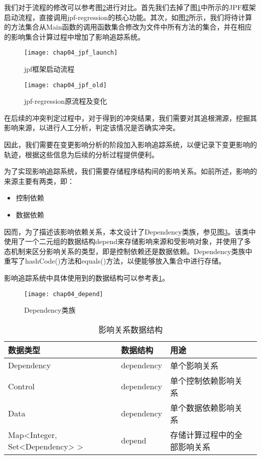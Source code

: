 我们对于流程的修改可以参考图\ref {impact_process_old}进行对比。首先我们去掉了图\ref {impact_process}中所示的JPF框架启动流程，直接调用jpf-regression的核心功能。其次，如图\ref {impact_process_old}所示，我们将待计算的方法集合从Main函数的调用函数集合修改为文件中所有方法的集合，并在相应的影响集合计算过程中增加了影响追踪系统。

\begin{figure}[H]
	\centering
	\texttt{[image: chap04\_jpf\_launch]}
	\caption {jpf框架启动流程}
	\label {impact_process}	
\end{figure}


\begin{figure}[H]
	\centering
	\texttt{[image: chap04\_jpf\_old]}
	\caption {jpf-regression原流程及变化}
	\label {impact_process_old}	
\end{figure}



在后续的冲突判定过程中，对于得到的冲突结果，我们需要对其追根溯源，挖掘其影响来源，以进行人工分析，判定该情况是否确实冲突。

因此，我们需要在变更影响分析的阶段加入影响追踪系统，以便记录下变更影响的轨迹，根据这些信息为后续的分析过程提供便利。

为了实现影响追踪系统，我们需要存储程序结构间的影响关系。如前所述，影响的来源主要有两类，即：
\begin{itemize}
	\item 控制依赖
	\item 数据依赖
\end{itemize}

因而，为了描述该影响依赖关系，本文设计了Dependency类族，参见图\ref {class_depend}。该类中使用了一个二元组的数据结构depend来存储影响来源和受影响对象，并使用了多态机制来区分影响关系的类型，即是控制依赖还是数据依赖。Dependency类族中重写了hashCode()方法和equals()方法，以便能够放入集合中进行存储。

影响追踪系统中具体使用到的数据结构可以参考表\ref {track_data}。

\begin{figure}[H]
	\centering
	\texttt{[image: chap04\_depend]}
	\caption {Dependency类族}
	\label {class_depend}	
\end{figure}

\begin{table}
	\caption{影响关系数据结构}
	\label{track_data}
	\centering
	\begin{tabular}{lllc}
		\toprule[1.5pt]
		{\heiti 数据类型} &{\heiti 数据结构} & {\heiti 用途} \\\midrule[1pt]
		Dependency & dependency & 单个影响关系 \\
		Control & dependency & 单个控制依赖影响关系 \\
		Data & dependency & 单个数据依赖影响关系 \\
		Map<Integer, Set<Dependency> > & depend & 存储计算过程中的全部影响关系\\
		\bottomrule[1.5pt]
	\end{tabular}
\end{table}

